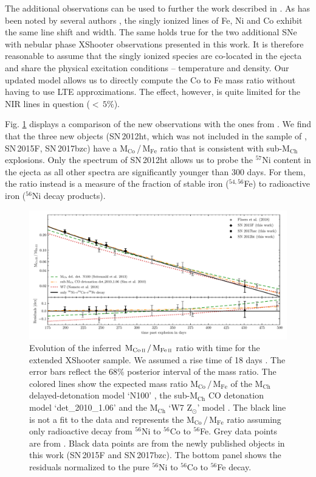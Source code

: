 \documentclass[fleqn,usenatbib]{mnras}
\begin{document}
The additional observations can be used to further the work described in \citet{2018A&A...620A.200F}. As has been noted by several authors \citep{2018MNRAS.477.3567M, 2018A&A...620A.200F}, the singly ionized lines of Fe, Ni and Co exhibit the same line shift and width. The same holds true for the two additional SNe with nebular phase XShooter observations presented in this work. It is therefore reasonable to assume that the singly ionized species are co-located in the ejecta and share the physical excitation conditions -- temperature and density. Our updated model allows us to directly compute the Co to Fe mass ratio without having to use LTE approximations. The effect, however, is quite limited for the NIR lines in question ($<\,5\%$). 

Fig. \ref{CoOverFe} displays a comparison of the new observations with the ones from \citet{2018MNRAS.477.3567M}. We find that the three new objects (SN\,2012ht, which was not included in the sample of \citeauthor{2018A&A...620A.200F} \citeyear{2018A&A...620A.200F}, SN\,2015F, SN\,2017bzc) have a M$_{\text{Co}}$\,/\,M$_{\text{Fe}}$ ratio that is consistent with sub-M$_{\text{Ch}}$ explosions. Only the spectrum of SN\,2012ht allows us to probe the $^{57}$Ni content in the ejecta as all other spectra are significantly younger than 300 days. For them, the ratio instead is a measure of the fraction of stable iron ($^{54,56}$Fe) to radioactive iron ($^{56}$Ni decay products). 
\begin{figure}
	\includegraphics[width=\linewidth]{plots/MFeCo.pdf}
    \caption{Evolution of the inferred $\mathrm{M_{\ion{Co}{II}}\,/\,M_{\ion{Fe}{II}}}$ ratio with time for the extended XShooter sample. We assumed a rise time of 18 days \citep{2011MNRAS.416.2607G}. The error bars reflect the $68\%$ posterior interval of the mass ratio. The colored lines show the expected mass ratio $\mathrm{M_{Co}\,/\,M_{Fe}}$ of the M$_{\text{Ch}}$ delayed-detonation model `N100' \citep[][green]{2013MNRAS.429.1156S}, the sub-M$_{\text{Ch}}$ CO detonation model `det\_2010\_1.06' \citep[][orange]{2010ApJ...714L..52S} and the M$_{\text{Ch}}$ `W7 Z$_\odot$' model \citep[][red]{2018SSRv..214...67N}. The black line is not a fit to the data and represents the $\mathrm{M_{Co}\,/\,M_{Fe}}$ ratio assuming only radioactive decay from $^{56}$Ni to $^{56}$Co to $^{56}$Fe. Grey data points are from \citet{2018A&A...620A.200F}. Black data points are from the newly published objects in this work (SN\,2015F and SN\,2017bzc). The bottom panel shows the residuals normalized to the pure $^{56}$Ni to $^{56}$Co to $^{56}$Fe decay.}
    \label{CoOverFe}
\end{figure}
\end{document}

